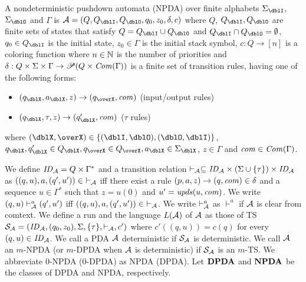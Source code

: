 \begin{definition}
A nondeterministic {pushdown automata} (NPDA) over finite alphabets $\Sigma_\dblI$, $\Sigma_\dblO$ and $\Gamma$ is $\calA = (Q, Q_\dblI, Q_\dblO, q_0, z_0, \delta, c)$ where
$Q$, $Q_\dblI, Q_\dblO$ are finite sets of states that satisfy $Q=Q_\dblI\cup Q_\dblO$ and $Q_\dblI \cap Q_\dblO = \emptyset$,
$q_0\in Q_\dblI$ is the initial state,
$z_0\in \Gamma$ is the initial stack symbol,
$c: Q \to [n]$ is a coloring function where $n\in \mathbb{N}$ is the number of priorities and
$\delta: Q \times \Sigma \times \Gamma \to \mathscr{P}(Q \times \mathit{Com}(\Gamma))$ is a finite set of transition rules, having one of the following forms:
\begin{itemize}
\item $(q_\dblX, a_\dblX, z) \rightarrow (q_\overX, \com)$ (input/output rules)
\item $(q_\dblX, \tau, z)\to(q'_\dblX,\com)$ ($\tau$ rules)
\end{itemize}
where $(\dblX, \overX)\in\{(\dblI, \dblO), (\dblO,\dblI)\}$,
$q_\dblX, q'_\dblX\in Q_\dblX, q_\overX\in Q_\overX, a_\dblX\in \Sigma_\dblX$, $z\in \Gamma$ and $\mathit{com}\in \mathit{Com}(\Gamma)$.
\end{definition}
We define $\mathit{ID}_{\cal A}= Q\times \Gamma^*$ and
a transition relation $\vdash_{\cal A}\subseteq \mathit{ID}_{\cal A}\times (\Sigma\cup\{\tau\})\times \mathit{ID}_{\cal A}$ as
$((q,u),a,(q',u'))\in\ \vdash_{\cal A}$ iff there exist a rule $(p, a, z) \rightarrow (q, \mathit{com}) \in \delta$ and a sequence $u\in \Gamma^*$ such that $z=u(0)$ and $u'=\mathit{upds}(u,\mathit{com})$.
We write $(q,u)\vdash^a_{\cal A}(q',u')$ iff
$((q,u),a,(q',u'))\in\ \vdash_{\cal A}$.
We write $\vdash^{a}_{\cal A}$ as $\vdash^{a}$ if ${\cal A}$ is clear from comtext.
We define a run and the language $L({\cal A})$ of ${\cal A}$ as those of TS ${\cal S}_{\cal A}=(\mathit{ID}_{\cal A}, (q_0,z_0),\Sigma, \{\tau\},\vdash_{\cal A},c')$
where $c'((q,u))= c(q)$ for every $(q,u)\in\mathit{ID}_{\cal A}$.
We call a PDA ${\cal A}$ deterministic if ${\cal S}_{\cal A}$ is deterministic.
We call ${\cal A}$ an $m$-NPDA (or $m$-DPDA when ${\cal A}$ is deterministic)
if ${\cal S}_{\cal A}$ is an $m$-TS.
We abbreviate $0$-NPDA ($0$-DPDA) as NPDA (DPDA).
Let ${\bf DPDA}$ and ${\bf NPDA}$ be the classes of DPDA and NPDA, respectively.

